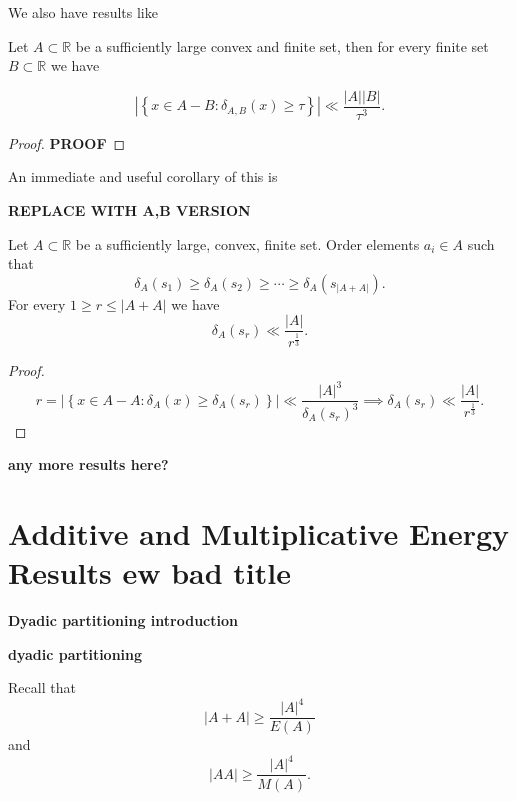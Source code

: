 \documentclass[12pt]{amsart}
\begin{document}
We also have results like

\begin{theorem}

    Let \(A \subset \mathbb{R} \) be a sufficiently large convex and finite set, then for every 
    finite set \(B \subset \mathbb{R} \) we have

    \[
        \left\lvert \left\{ x \in A-B : \delta_{A,B} (x) \geq \tau \right\}  \right\rvert \ll \frac{\left\lvert A \right\rvert \left\lvert B \right\rvert }{\tau^{3} }
    .\]
\end{theorem}

\begin{proof}
\textbf{PROOF}
\end{proof}

An immediate and useful corollary of this is

\textbf{REPLACE WITH A,B VERSION}

\begin{corollary}
Let \(A \subset \mathbb{R} \) be a sufficiently large, convex, finite set.
Order elements \(a_{i} \in A\) such that 
\[
    \delta_{A} (s_1) \geq \delta_{A} (s_2) \geq \cdots \geq \delta_{A} (s _{\left\lvert A+A \right\rvert } )
.\]
For every \(1 \geq r \leq \left\lvert A+A \right\rvert\) we have
\[
    \delta_{A} (s _{r} ) \ll \frac{\left\lvert A \right\rvert }{r^{\frac{1}{3} }}
.\]
\end{corollary}

\begin{proof}
\[
    r = \left\lvert \left\{ x \in A-A : \delta _{A} (x) \geq \delta_{A} (s _{r} ) \right\}  \right\rvert \ll \frac{\left\lvert A \right\rvert ^{3} }{\delta_{A} (s _{r} )^{3} } \implies \delta_{A} (s _{r} ) \ll \frac{\left\lvert A \right\rvert }{r^{\frac{1}{3} }}
.\]
\end{proof}

\textbf{any more results here?}

\section{Additive and Multiplicative Energy Results \textbf{ew bad title} }

\textbf{Dyadic partitioning introduction}

\begin{lemma}
\textbf{dyadic partitioning}
\end{lemma}

Recall that
\[
    \left\lvert A + A \right\rvert \geq  \frac{\left\lvert A \right\rvert ^{4}}{ E(A) }
\]
and
\[
    \left\lvert AA \right\rvert \geq \frac{\left\lvert A \right\rvert ^{4}}{M(A) }
.\]
\end{document}
